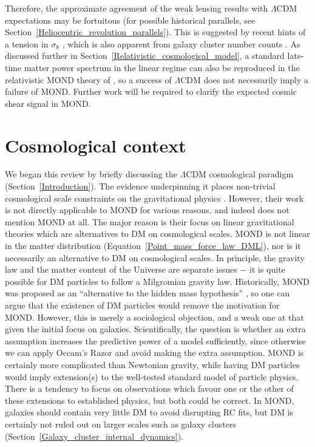 \documentclass[fleqn,usenatbib,useAMS,onecolumn]{mnras} %
\begin{document}
Therefore, the approximate agreement of the weak lensing results with $\Lambda$CDM expectations may be fortuitous (for possible historical parallels, see Section~\ref{Heliocentric_revolution_parallels}). This is suggested by recent hints of a tension in $\sigma_8$ \citep{Asgari_2021, Heymans_2021, Secco_2022}, which is also apparent from galaxy cluster number counts \citep{Schrabback_2021_calibration}. As discussed further in Section~\ref{Relativistic_cosmological_model}, a standard late-time matter power spectrum in the linear regime can also be reproduced in the relativistic MOND theory of \citet{Skordis_2021}, so a success of $\Lambda$CDM does not necessarily imply a failure of MOND. Further work will be required to clarify the expected cosmic shear signal in MOND.





\section{Cosmological context}
\label{Cosmological_context}

We began this review by briefly discussing the $\Lambda$CDM cosmological paradigm (Section~\ref{Introduction}). The evidence underpinning it places non-trivial cosmological scale constraints on the gravitational physics \citep{Pardo_2020}. However, their work is not directly applicable to MOND for various reasons, and indeed does not mention MOND at all. The major reason is their focus on linear gravitational theories which are alternatives to DM on cosmological scales. MOND is not linear in the matter distribution (Equation~\ref{Point_mass_force_law_DML}), nor is it necessarily an alternative to DM on cosmological scales. In principle, the gravity law and the matter content of the Universe are separate issues $-$ it is quite possible for DM particles to follow a Milgromian gravity law. Historically, MOND was proposed as an ``alternative to the hidden mass hypothesis'' \citep{Milgrom_1983}, so one can argue that the existence of DM particles would remove the motivation for MOND. However, this is merely a sociological objection, and a weak one at that given the initial focus on galaxies. Scientifically, the question is whether an extra assumption increases the predictive power of a model sufficiently, since otherwise we can apply Occam's Razor and avoid making the extra assumption. MOND is certainly more complicated than Newtonian gravity, while having DM particles would imply extension(s) to the well-tested standard model of particle physics. There is a tendency to focus on observations which favour one or the other of these extensions to established physics, but both could be correct. In MOND, galaxies should contain very little DM to avoid disrupting RC fits, but DM is certainly not ruled out on larger scales such as galaxy clusters (Section~\ref{Galaxy_cluster_internal_dynamics}).
\end{document}
